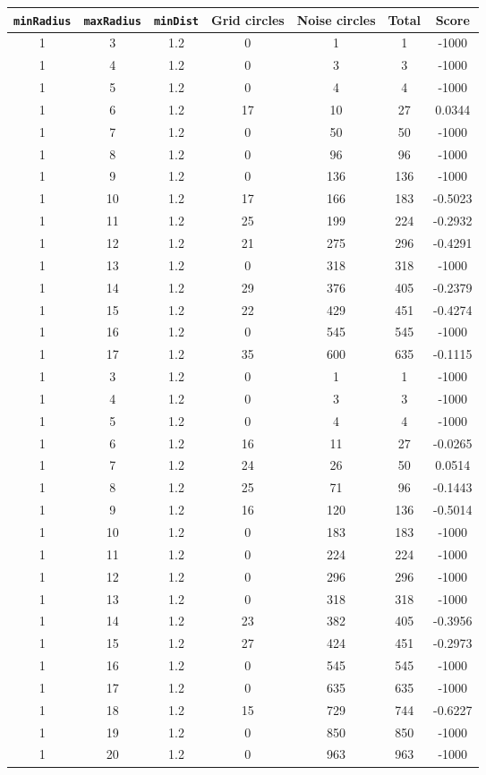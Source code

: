 \documentclass[letterpaper, 12pt]{article}
\begin{document}
\begin{longtable}{|c|c|c|c|c|c|c|}
\hline
\textbf{\texttt{minRadius}} & \textbf{\texttt{maxRadius}} & \textbf{\texttt{minDist}} & \textbf{Grid circles} & \textbf{Noise circles} & \textbf{Total} & \textbf{Score} \\
\hline
1 & 3 & 1.2 & 0 & 1 & 1 & -1000 \\
\hline
1 & 4 & 1.2 & 0 & 3 & 3 & -1000 \\
\hline
1 & 5 & 1.2 & 0 & 4 & 4 & -1000 \\
\hline
1 & 6 & 1.2 & 17 & 10 & 27 & 0.0344 \\
\hline
1 & 7 & 1.2 & 0 & 50 & 50 & -1000 \\
\hline
1 & 8 & 1.2 & 0 & 96 & 96 & -1000 \\
\hline
1 & 9 & 1.2 & 0 & 136 & 136 & -1000 \\
\hline
1 & 10 & 1.2 & 17 & 166 & 183 & -0.5023 \\
\hline
1 & 11 & 1.2 & 25 & 199 & 224 & -0.2932 \\
\hline
1 & 12 & 1.2 & 21 & 275 & 296 & -0.4291 \\
\hline
1 & 13 & 1.2 & 0 & 318 & 318 & -1000 \\
\hline
1 & 14 & 1.2 & 29 & 376 & 405 & -0.2379 \\
\hline
1 & 15 & 1.2 & 22 & 429 & 451 & -0.4274 \\
\hline
1 & 16 & 1.2 & 0 & 545 & 545 & -1000 \\
\hline
1 & 17 & 1.2 & 35 & 600 & 635 & -0.1115 \\
\hline
1 & 3 & 1.2 & 0 & 1 & 1 & -1000 \\
\hline
1 & 4 & 1.2 & 0 & 3 & 3 & -1000 \\
\hline
1 & 5 & 1.2 & 0 & 4 & 4 & -1000 \\
\hline
1 & 6 & 1.2 & 16 & 11 & 27 & -0.0265 \\
\hline
1 & 7 & 1.2 & 24 & 26 & 50 & 0.0514 \\
\hline
1 & 8 & 1.2 & 25 & 71 & 96 & -0.1443 \\
\hline
1 & 9 & 1.2 & 16 & 120 & 136 & -0.5014 \\
\hline
1 & 10 & 1.2 & 0 & 183 & 183 & -1000 \\
\hline
1 & 11 & 1.2 & 0 & 224 & 224 & -1000 \\
\hline
1 & 12 & 1.2 & 0 & 296 & 296 & -1000 \\
\hline
1 & 13 & 1.2 & 0 & 318 & 318 & -1000 \\
\hline
1 & 14 & 1.2 & 23 & 382 & 405 & -0.3956 \\
\hline
1 & 15 & 1.2 & 27 & 424 & 451 & -0.2973 \\
\hline
1 & 16 & 1.2 & 0 & 545 & 545 & -1000 \\
\hline
1 & 17 & 1.2 & 0 & 635 & 635 & -1000 \\
\hline
1 & 18 & 1.2 & 15 & 729 & 744 & -0.6227 \\
\hline
1 & 19 & 1.2 & 0 & 850 & 850 & -1000 \\
\hline
1 & 20 & 1.2 & 0 & 963 & 963 & -1000 \\
\hline
\end{longtable}
\end{document}

